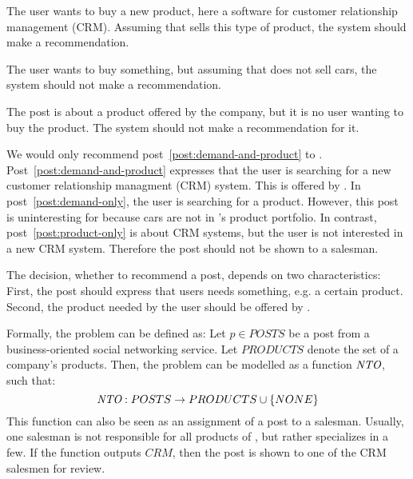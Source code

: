 \begin{post}
	\centering
	\caption{The user wants to buy a new product, here a software for customer relationship management (CRM). Assuming that \acme sells this type of product, the system should make a recommendation.}
	\label{post:demand-and-product}
\end{post}

\begin{post}
	\centering
	\caption{The user wants to buy something, but assuming that \acme does not sell cars, the system should not make a recommendation.}
	\label{post:demand-only}
\end{post}

\begin{post}
	\centering
	\caption{The post is about a product offered by the company, but it is no user wanting to buy the product. The system should not make a recommendation for it.}
	\label{post:product-only}
\end{post}

We would only recommend post~\ref{post:demand-and-product} to \acme.
Post~\ref{post:demand-and-product} expresses that the user is searching for a new customer relationship managment (CRM) system.
This is offered by \acme.
In post~\ref{post:demand-only}, the user is searching for a product.
However, this post is uninteresting for \acme because cars are not in \acme's product portfolio.
In contrast, post~\ref{post:product-only} is about CRM systems, but the user is not interested in a new CRM system.
Therefore the post should not be shown to a salesman.

The decision, whether to recommend a post, depends on two characteristics:
First, the post should express that users needs something, e.g. a certain product.
Second, the product needed by the user should be offered by \acme.

Formally, the problem can be defined as:
Let $p \in POSTS$ be a post from a business-oriented social networking service.
Let $PRODUCTS$ denote the set of a company's products.
Then, the problem can be modelled as a function $\emph{NTO}$, such that:
\begin{displaymath}
	\emph{NTO}: POSTS \to PRODUCTS \cup \{NONE\}
\end{displaymath}
This function can also be seen as an assignment of a post to a salesman.
Usually, one salesman is not responsible for all products of \acme, but rather specializes in a few.
If the \nto function outputs $CRM$, then the post is shown to one of the CRM salesmen for review.


